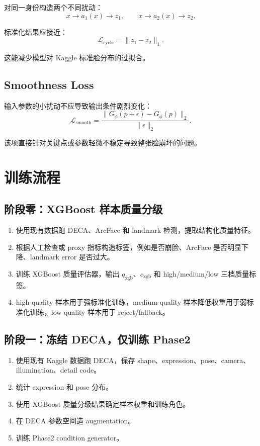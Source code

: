 \documentclass[UTF8,12pt,fontset=fandol]{ctexart}
\begin{document}
对同一身份构造两个不同扰动：
\[
x \rightarrow a_1(x) \rightarrow z_1,
\qquad
x \rightarrow a_2(x) \rightarrow z_2.
\]

标准化结果应接近：
\[
\mathcal{L}_{\text{cycle}}=\|z_1-z_2\|_1.
\]

这能减少模型对 Kaggle 标准脸分布的过拟合。

\subsection{Smoothness Loss}

输入参数的小扰动不应导致输出条件剧烈变化：
\[
\mathcal{L}_{\text{smooth}} =
\frac{\|G_{\phi}(p+\epsilon)-G_{\phi}(p)\|_2}{\|\epsilon\|_2}.
\]

该项直接针对关键点或参数轻微不稳定导致整张脸崩坏的问题。

\section{训练流程}

\subsection{阶段零：XGBoost 样本质量分级}

\begin{enumerate}
    \item 使用现有数据跑 DECA、ArcFace 和 landmark 检测，提取结构化质量特征。
    \item 根据人工检查或 proxy 指标构造标签，例如是否崩脸、ArcFace 是否明显下降、landmark error 是否过大。
    \item 训练 XGBoost 质量评估器，输出 \(q_{\text{xgb}}\)、\(c_{\text{xgb}}\) 和 high/medium/low 三档质量标签。
    \item high-quality 样本用于强标准化训练，medium-quality 样本降低权重用于弱标准化训练，low-quality 样本用于 reject/fallback。
\end{enumerate}

\subsection{阶段一：冻结 DECA，仅训练 Phase2}

\begin{enumerate}
    \item 使用现有 Kaggle 数据跑 DECA，保存 shape、expression、pose、camera、illumination、detail code。
    \item 统计 expression 和 pose 分布。
    \item 使用 XGBoost 质量分级结果确定样本权重和训练角色。
    \item 在 DECA 参数空间造 augmentation。
    \item 训练 Phase2 condition generator。
\end{enumerate}
\end{document}
